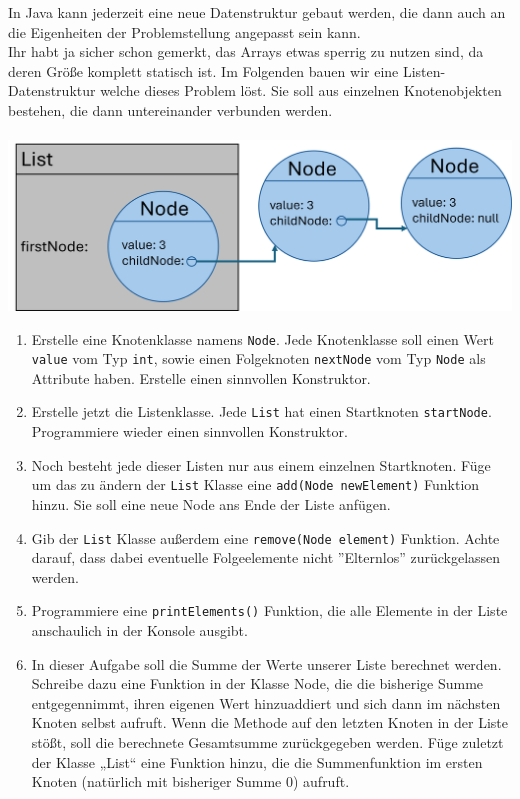 \documentclass{../../sheet}
\begin{document}
\newpage
{}
In Java kann jederzeit eine neue Datenstruktur gebaut werden, die dann auch an die Eigenheiten der Problemstellung angepasst sein kann. \\
Ihr habt ja sicher schon gemerkt, das Arrays etwas sperrig zu nutzen sind, da deren Größe komplett statisch ist. Im Folgenden bauen wir eine Listen-Datenstruktur welche dieses Problem löst. Sie soll aus einzelnen Knotenobjekten bestehen, die dann untereinander verbunden werden. \\
\\
\includegraphics[width=\linewidth]{img/linkedlist.png}

\begin{enumerate}
    \item Erstelle eine Knotenklasse namens \texttt{Node}. Jede Knotenklasse soll einen Wert \texttt{value} vom Typ \texttt{int}, sowie einen Folgeknoten \texttt{nextNode} vom Typ \texttt{Node} als Attribute haben. Erstelle einen sinnvollen Konstruktor.
    \item Erstelle jetzt die Listenklasse. Jede \texttt{List} hat einen Startknoten \texttt{startNode}. Programmiere wieder einen sinnvollen Konstruktor.
    \item Noch besteht jede dieser Listen nur aus einem einzelnen Startknoten. Füge um das zu ändern der \texttt{List} Klasse eine \texttt{add(Node newElement)} Funktion hinzu. Sie soll eine neue Node ans Ende der Liste anfügen.
    \item Gib der \texttt{List} Klasse außerdem eine \texttt{remove(Node element)} Funktion. Achte darauf, dass dabei eventuelle Folgeelemente nicht ''Elternlos'' zurückgelassen werden.
    \item Programmiere eine \texttt{printElements()} Funktion, die alle Elemente in der Liste anschaulich in der Konsole ausgibt.
    \item In dieser Aufgabe soll die Summe der Werte unserer Liste berechnet werden. Schreibe dazu eine Funktion in der Klasse Node, die die bisherige Summe entgegennimmt, ihren eigenen Wert hinzuaddiert und sich dann im nächsten Knoten selbst aufruft. Wenn die Methode auf den letzten Knoten in der Liste stößt, soll die berechnete Gesamtsumme zurückgegeben werden. Füge zuletzt der Klasse „List“ eine Funktion hinzu, die die Summenfunktion im ersten Knoten (natürlich mit bisheriger Summe 0) aufruft.
\end{enumerate}
\end{document}
